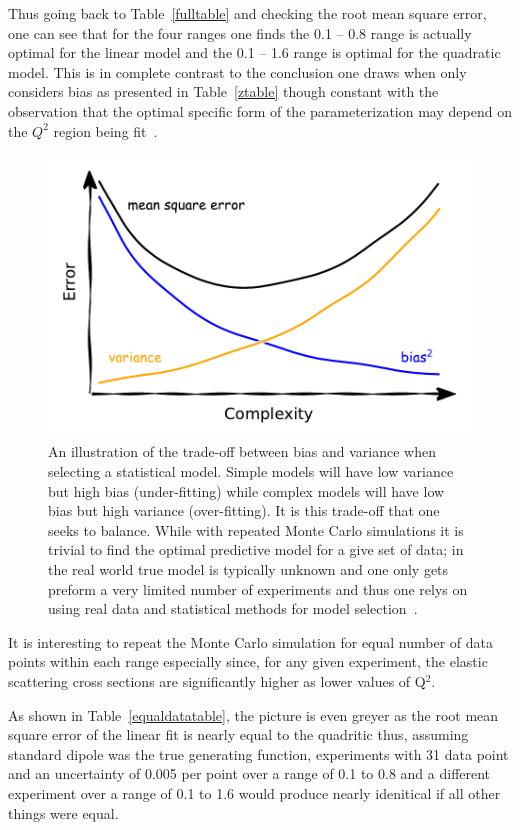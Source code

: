 \documentclass[10pt,aps,prc,twocolumn]{revtex4-1}
\begin{document}
Thus going back to Table~\ref{fulltable} and checking the root mean square error, one can see that for the four ranges
one finds the 0.1 -- 0.8 range is actually optimal for the linear model and the 0.1 -- 1.6 range is optimal for the quadratic model. 
This is in complete contrast to the conclusion one draws when only considers bias as presented in Table~\ref{ztable}
though constant with the observation that the optimal specific form of the parameterization may depend on the $Q^2$ region
being fit~\cite{Alberico:2008sz}.
\begin{figure}
\includegraphics[width=\columnwidth]{Figure/biasvariance.pdf}
\caption{An illustration of the trade-off between bias and variance when selecting a statistical model.   Simple models
will have low variance but high bias (under-fitting) while complex models will have low bias but high variance (over-fitting).   
It is this trade-off that one seeks to balance.   While with repeated  Monte Carlo simulations it is trivial to find the optimal
predictive model for a give set of data; in the real world true model is typically unknown and one only gets preform a very limited number
of experiments and thus one relys on using real data and statistical methods for model selection~\cite{Hastie:2009}.
}
\end{figure}

It is interesting to repeat the Monte Carlo simulation for equal number of data points within each range
especially since, for any given experiment, the elastic scattering cross sections are significantly higher as lower values
of Q$^2$.

As shown in Table~\ref{equaldatatable}, the picture is even greyer as the root mean square error of the linear 
fit is nearly equal to the quadritic thus, assuming standard dipole was the true generating function,  experiments
with 31 data point and an uncertainty of 0.005 per point over a range of 0.1 to 0.8 and a different experiment
over a range of 0.1 to 1.6 would produce nearly idenitical if all other things were equal.
\end{document}

